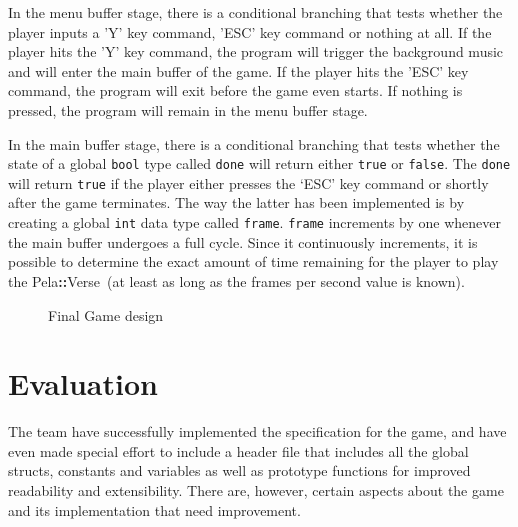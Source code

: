 \documentclass[11pt]{article}
\newcommand{\pelahverse}{Pela\hspace*{1pt}\textbf{::}Verse}
\begin{document}
In the menu buffer stage, there is a conditional branching that tests whether the player inputs a 'Y' key command, 'ESC' key command or nothing at all. If the player hits the 'Y' key command, the program will trigger the background music and will enter the main buffer of the game. If the player hits the 'ESC' key command, the program will exit before the game even starts. If nothing is pressed, the program will remain in the menu buffer stage. 

In the main buffer stage, there is a conditional branching that tests whether the state of a global \texttt{bool} type called \texttt{done} will return either \texttt{true} or \texttt{false}. The \texttt{done} will return \texttt{true} if the player either presses the `ESC' key command or shortly after the game terminates. The way the latter has been implemented is by creating a global \texttt{int} data type called \texttt{frame}. \texttt{frame} increments by one whenever the main buffer undergoes a full cycle. Since it continuously increments, it is possible to determine the exact amount of time remaining for the player to play the \pelahverse\ (at least as long as the frames per second value is known). 


\begin{figure}[h!]
    \centering
    \caption{Final Game design}%
    \label{fig:final-design}
\end{figure}


\section{Evaluation}
The team have successfully implemented the specification for the game, and have even made special effort to include a header file that includes all the global structs, constants and variables as well as prototype functions for improved readability and extensibility. There are, however, certain aspects about the game and its implementation that need improvement.
\end{document}
